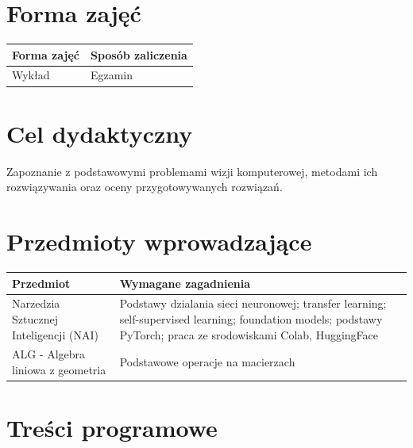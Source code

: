 \documentclass[12pt, a4paper]{article}
\begin{document}
\section{Forma zajęć}

\begin{tabular}{ll}
  \hline
  \textbf{Forma zajęć} & \textbf{Sposób zaliczenia} \\
  \hline
  Wykład & Egzamin \\
  \hline
\end{tabular}

\section{Cel dydaktyczny}

Zapoznanie z podstawowymi problemami wizji komputerowej, metodami ich rozwiązywania oraz oceny przygotowywanych rozwiązań.

\section{Przedmioty wprowadzające}

\begin{tabularx}{\textwidth}{lX}
  \hline
  \textbf{Przedmiot} & \textbf{Wymagane zagadnienia} \\
  \hline
  Narzedzia Sztucznej Inteligencji (NAI) & Podstawy dzialania sieci neuronowej; transfer learning; self-supervised learning; foundation models; podstawy PyTorch; praca ze srodowiskami Colab, HuggingFace \\
  ALG - Algebra liniowa z geometria & Podstawowe operacje na macierzach \\
  \hline
\end{tabularx}

\section{Treści programowe}
\end{document}
